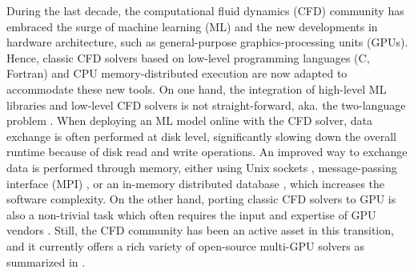 \documentclass[10pt,a4paper]{article}
\begin{document}
During the last decade, the computational fluid dynamics (CFD) community has embraced the surge of machine learning (ML) and the new developments in hardware architecture, such as general-purpose graphics-processing units (GPUs). Hence, classic CFD solvers based on low-level programming languages (C, Fortran) and CPU memory-distributed execution are now adapted to accommodate these new tools. On one hand, the integration of high-level ML libraries and low-level CFD solvers is not straight-forward, aka. the two-language problem \citep{Churavy2022}. When deploying an ML model online with the CFD solver, data exchange is often performed at disk level, significantly slowing down the overall runtime because of disk read and write operations. An improved way to exchange data is performed through memory, either using Unix sockets \citep{Rabault2019, Font2021}, message-passing interface (MPI) \citep{Guastoni2023}, or an in-memory distributed database \citep{Kurz2022,Font2024,Font2025}, which increases the software complexity. On the other hand, porting classic CFD solvers to GPU is also a non-trivial task which often requires the input and expertise of GPU vendors \citep{Romero2022}. Still, the CFD community has been an active asset in this transition, and it currently offers a rich variety of open-source multi-GPU solvers as summarized in .
\end{document}
